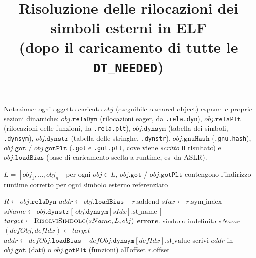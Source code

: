 \documentclass[11pt]{article}
\title{Risoluzione delle rilocazioni dei simboli esterni in ELF\\
\large (dopo il caricamento di tutte le \texttt{DT\_NEEDED})}
\author{}
\date{}
\begin{document}
\maketitle

\noindent
Notazione: ogni oggetto caricato $obj$ (eseguibile o shared object) espone le
proprie sezioni dinamiche: $obj.\texttt{relaDyn}$ (rilocazioni eager, da
\texttt{.rela.dyn}), $obj.\texttt{relaPlt}$ (rilocazioni delle funzioni, da
\texttt{.rela.plt}), $obj.\texttt{dynsym}$ (tabella dei simboli,
\texttt{.dynsym}), $obj.\texttt{dynstr}$ (tabella delle stringhe,
\texttt{.dynstr}), $obj.\texttt{gnuHash}$ (\texttt{.gnu.hash}),
$obj.\texttt{got}$ / $obj.\texttt{gotPlt}$ (\texttt{.got} e \texttt{.got.plt},
dove viene \emph{scritto} il risultato) e $obj.\texttt{loadBias}$ (base di
caricamento scelta a runtime, es. da ASLR).

\begin{algorithm}[h]
\caption{\textsc{RisolviRilocazioni} --- eseguito da \texttt{ld.so} per ogni
oggetto $obj$ del grafo di dipendenze, dopo che tutte le \texttt{DT\_NEEDED}
sono state mappate in memoria}
\begin{algorithmic}[1]
\REQUIRE $L = [obj_1,\dots,obj_n]$ 
\ENSURE per ogni $obj \in L$, $obj.\texttt{got}$ / $obj.\texttt{gotPlt}$
contengono l'indirizzo runtime corretto per ogni simbolo esterno referenziato

    \STATE $R \gets obj.\texttt{relaDyn}$ 
            \STATE $addr \gets obj.\texttt{loadBias} + r.\text{addend}$ 
        \ELSE
                \STATE $sIdx \gets r.\text{sym\_index}$
                \STATE $sName \gets obj.\texttt{dynstr}[\, obj.\texttt{dynsym}[sIdx].\text{st\_name} \,]$ 
                \STATE $target \gets \textsc{RisolviSimbolo}(sName, L, obj)$
                    \STATE \textbf{errore}: simbolo indefinito $sName$ 
                \ELSE
                    \STATE $(defObj, defIdx) \gets target$
                    \STATE $addr \gets defObj.\texttt{loadBias} + defObj.\texttt{dynsym}[defIdx].\text{st\_value}$ 
                \ENDIF
            \ENDIF
        \ENDIF
        \STATE scrivi $addr$ in $obj.\texttt{got}$ (dati) o $obj.\texttt{gotPlt}$ (funzioni) all'offset $r.\text{offset}$ 
    \ENDFOR
\ENDFOR
\end{algorithmic}
\end{algorithm}
\end{document}
